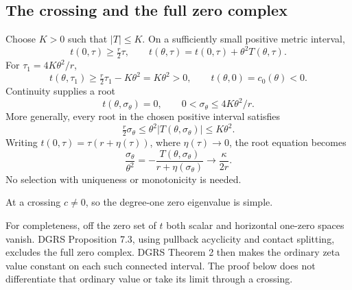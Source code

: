 \documentclass[11pt,letterpaper,reqno]{amsart}
\theoremstyle{remark}
\begin{document}
\subsection{The crossing and the full zero complex}\label{sec:crossings}
Choose \(K>0\) such that \(|T|\leq K\).  On a sufficiently small
positive metric interval,
\[
 t(0,\tau)\geq\tfrac r2\tau,
 \qquad
 t(\theta,\tau)=t(0,\tau)+\theta^2T(\theta,\tau).
\]
For \(\tau_1=4K\theta^2/r\),
\[
 t(\theta,\tau_1)
       \geq\tfrac r2\tau_1-K\theta^2
       =K\theta^2>0,
 \qquad t(\theta,0)=c_0(\theta)<0.
\]
Continuity supplies a root
\begin{equation}\label{cross}
 t(\theta,\sigma_\theta)=0,
 \qquad 0<\sigma_\theta\leq4K\theta^2/r.
\end{equation}
More generally, every root in the chosen positive interval satisfies
\[
 \tfrac r2\sigma_\theta
     \leq\theta^2|T(\theta,\sigma_\theta)|
     \leq K\theta^2.
\]
Writing \(t(0,\tau)=\tau(r+\eta(\tau))\), where
\(\eta(\tau)\to0\), the root equation becomes
\begin{equation}\label{xp:crossing-asymptotic}
 \frac{\sigma_\theta}{\theta^2}
    =-\frac{T(\theta,\sigma_\theta)}{r+\eta(\sigma_\theta)}
    \longrightarrow\frac\kappa{2r}.
\end{equation}
No selection with uniqueness or monotonicity is needed.

At a crossing $c\ne0$, so the degree-one zero eigenvalue is simple.

For completeness, off the zero set of $t$ both scalar and horizontal
one-zero spaces vanish. DGRS Proposition 7.3, using pullback
acyclicity and contact splitting, excludes the full zero complex.
DGRS Theorem 2 then makes the ordinary zeta value constant on each
such connected interval. The proof below does not differentiate that
ordinary value or take its limit through a crossing.
\end{document}
